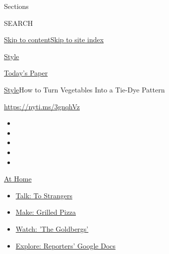 Sections

SEARCH

\protect\hyperlink{site-content}{Skip to
content}\protect\hyperlink{site-index}{Skip to site index}

\href{https://www.nytimes3xbfgragh.onion/section/style}{Style}

\href{https://myaccount.nytimes3xbfgragh.onion/auth/login?response_type=cookie\&client_id=vi}{}

\href{https://www.nytimes3xbfgragh.onion/section/todayspaper}{Today's
Paper}

\href{/section/style}{Style}\textbar{}How to Turn Vegetables Into a
Tie-Dye Pattern

\url{https://nyti.ms/3gnqhVz}

\begin{itemize}
\item
\item
\item
\item
\item
\end{itemize}

\href{https://www.nytimes3xbfgragh.onion/spotlight/at-home?action=click\&pgtype=Article\&state=default\&region=TOP_BANNER\&context=at_home_menu}{At
Home}

\begin{itemize}
\tightlist
\item
  \href{https://www.nytimes3xbfgragh.onion/2020/08/03/well/family/the-benefits-of-talking-to-strangers.html?action=click\&pgtype=Article\&state=default\&region=TOP_BANNER\&context=at_home_menu}{Talk:
  To Strangers}
\item
  \href{https://www.nytimes3xbfgragh.onion/2020/08/01/at-home/coronavirus-make-pizza-on-a-grill.html?action=click\&pgtype=Article\&state=default\&region=TOP_BANNER\&context=at_home_menu}{Make:
  Grilled Pizza}
\item
  \href{https://www.nytimes3xbfgragh.onion/2020/07/31/arts/television/goldbergs-abc-stream.html?action=click\&pgtype=Article\&state=default\&region=TOP_BANNER\&context=at_home_menu}{Watch:
  'The Goldbergs'}
\item
  \href{https://www.nytimes3xbfgragh.onion/interactive/2020/at-home/even-more-reporters-editors-diaries-lists-recommendations.html?action=click\&pgtype=Article\&state=default\&region=TOP_BANNER\&context=at_home_menu}{Explore:
  Reporters' Google Docs}
\end{itemize}

